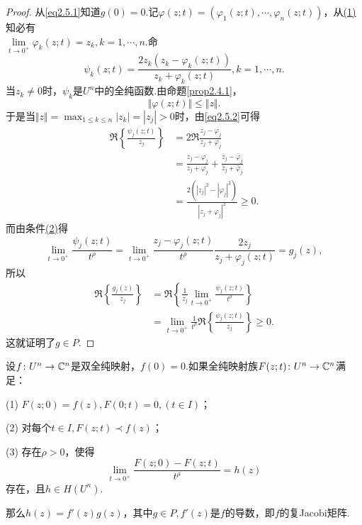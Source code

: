 \begin{proof}
	从\eqref{eq2.5.1}知道$g(0)=0$.记$\varphi(z;t)=(\varphi_1(z;t),\cdots,\varphi_n(z;t))$，从\hyperlink{2.5.3}{(1)}知必有\\
	$\lim\limits_{t\to 0^+}\varphi_k(z;t)=z_k,k=1,\cdots,n$.命
	\[\psi_k(z;t)=\frac{2z_k(z_k-\varphi_k(z;t))}{z_k+\varphi_k(z;t)},k=1,\cdots,n.\]
	当$z_k\neq0$时，$\psi_k$是$U^n$中的全纯函数.由命题\ref{prop2.4.1}，
	\begin{equation}\label{eq2.5.2}
		\Vert\varphi(z;t)\Vert\le\Vert z\Vert.
	\end{equation}
于是当$\Vert z\Vert=\max_{1\le k\le n}|z_k|=|z_j|>0$时，由\eqref{eq2.5.2}可得
\begin{align*}
	\Re\left\{\frac{\psi_j(z;t)}{z_j}\right\}
	&=2\Re\frac{z_j-\varphi_j}{z_j+\varphi_j}\\
	&=\frac{z_j-\varphi_j}{z_j+\varphi_j}+\frac{\bar{z}_j-\bar{\varphi}_j}{\bar{z}_j+\bar{\varphi}_j}\\
	&=\frac{2(|z_j|^2-|\varphi_j|^2)}{|z_j+\varphi_j|^2}\ge0.
\end{align*}
而由条件\hyperlink{2.5.3}{(2)}得
\[\lim_{t\to 0^+} \frac{\psi_j(z;t)}{t^\rho}=\lim_{t\to 0^+}\frac{z_j-\varphi_j(z;t)}{t^\rho}\frac{2z_j}{z_j+\varphi_j(z;t)}=g_j(z),\]
所以
\begin{align*}
	\Re\left\{\frac{g_j(z)}{z_j}\right\}
	&=\Re\left\{\frac1{z_j}\lim\limits_{t\to 0^+}\frac{\psi_j(z;t)}{t^\rho}\right\}\\
	&=\lim_{t\to 0^+} \frac1{t^\rho}\Re\left\{\frac{\psi_j(z;t)}{z_j}\right\}\ge0.
\end{align*}
这就证明了$g\in P$.
\end{proof}
\begin{lemma}\label{lem2.5.4}
	设$f\colon U^n\to\mathbb C^n$是双全纯映射，$f(0)=0$.如果全纯映射族$F(z;t)\colon U^n\to\mathbb C^n$满足：
	
	(1)\hypertarget{2.5.4}{}
	$F(z;0)=f(z),F(0;t)=0,(t\in I)$；
	
	(2)\hypertarget{2.5.4}{}
	对每个$t\in I,F(z;t)\prec f(z)$；
	
	(3)\hypertarget{2.5.4}{}
	存在$\rho>0$，使得
	\[\lim_{t\to 0^+} \frac{F(z;0)-F(z;t)}{t^\rho}=h(z)\]
	存在，且$h\in H(U^n)$.
	
	那么$h(z)=f'(z)g(z)$，其中$g\in P,f'(z)$是$f$的导数，即$f$的复Jacobi矩阵.
\end{lemma}
